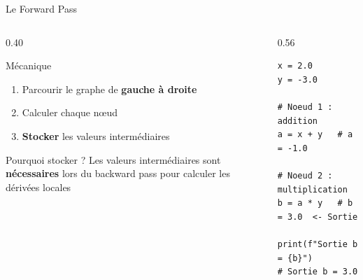 \documentclass[aspectratio=169, 10pt]{beamer}
\begin{document}
\begin{frame}[fragile]{Le Forward Pass}
  \begin{columns}[T]
    \begin{column}{0.40\textwidth}
      \begin{block}{Mécanique}
        \begin{enumerate}
          \item Parcourir le graphe de \textbf{gauche à droite}
          \item Calculer chaque nœud
          \item \textbf{Stocker} les valeurs intermédiaires
        \end{enumerate}
      \end{block}
      \smallskip
      \begin{alertblock}{Pourquoi stocker ?}
        Les valeurs intermédiaires sont \textbf{nécessaires} lors du backward pass pour calculer les dérivées locales
      \end{alertblock}
    \end{column}
    \begin{column}{0.56\textwidth}
      \begin{lstlisting}[style=pythonstyle]
x = 2.0
y = -3.0

# Noeud 1 : addition
a = x + y   # a = -1.0

# Noeud 2 : multiplication
b = a * y   # b = 3.0  <- Sortie

print(f"Sortie b = {b}")
# Sortie b = 3.0
      \end{lstlisting}
    \end{column}
  \end{columns}
\end{frame}
\end{document}

